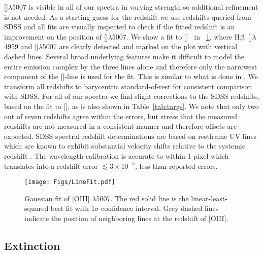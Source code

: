 \documentclass{aa}    %
\newcommand{\figref}[1]{\ref{fig:#1}}
\newcommand{\Fig}[1]{\figurename~\figref{#1}}
\newcommand{\figlabel}[1]{\label{fig:#1}}
\newcommand{\Tab}[1]{Table~\ref{tab:#1}}
\newcommand{\tab}[1]{\Tab{#1}}
\newcommand{\sectlabel}[1]{\label{sect:#1}}
\newcommand{\hb}{H$\beta$}
\newcommand{\oiii}{[\ion{O}{iii}]}
\begin{document}
\oiii$\lambda$5007 is visible in all of our spectra in varying strength so additional refinement is not needed. As a starting guess for the redshift we use redshifts queried from SDSS and all fits are visually inspected to check if the fitted redshift is an improvement on the position of \oiii$\lambda$5007. We show a fit to \oiii~ in \Fig{linefit}, where \hb, \oiii$\lambda$4959 and \oiii$\lambda$5007 are clearly detected and marked on the plot with vertical dashed lines. Several broad underlying features make it difficult to model the entire emission complex by the three lines alone and therefore only the narrowest component of the \oiii-line is used for the fit. This is similar to what is done in \citet{VandenBerk2001}. We transform all redshifts to barycentric standard-of-rest for consistent comparison with SDSS. For all of our spectra we find slight corrections to the SDSS redshifts, based on the fit to \oiii, as is also shown in \tab{targs}. We note that only two out of seven redshifts agree within the errors, but stress that the measured redshifts are not measured in a consistent manner and therefore offsets are expected. SDSS spectral redshift determinations are based on restframe UV lines which are known to exhibit substantial velocity shifts relative to the systemic redshift \citep{Tytler1992, Hewett2010}. The wavelength calibration is accurate to within 1 pixel \citep{Kruhler2015} which translates into a redshift error $\lesssim 3\times 10^{-5}$, less than reported errors.

\begin{figure}[t!]
  \centering
  \texttt{[image: Figs/LineFit.pdf]}
  \caption[]{Gaussian fit of [OIII] $\lambda$5007. The red solid line is the linear-least-squared best fit with 1$\sigma$ confidence interval. Grey dashed lines indicate the position of neighboring lines at the redshift of [OIII].}
  \figlabel{linefit}
\end{figure}




\subsection{Extinction} \sectlabel{extinct}
\end{document}
